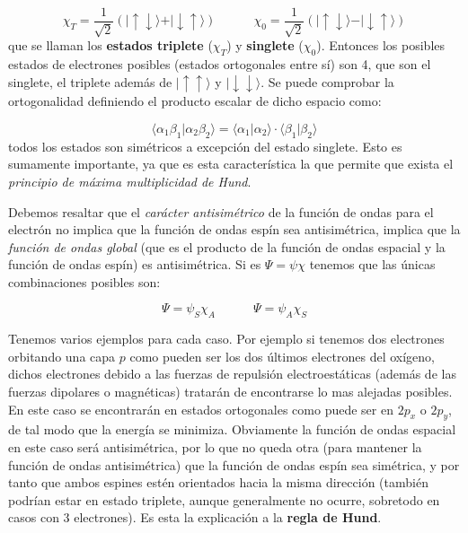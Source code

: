 \documentclass[12pt,a4paper]{article}
\numberwithin{equation}{section}
\numberwithin{figure}{section}
\newcommand{\tquad}{\quad \quad \quad}
\begin{document}
\begin{equation}
\chi_T = \frac{1}{\sqrt{2}} ( \vert \uparrow \downarrow \rangle + \vert \downarrow \uparrow \rangle) \tquad \chi_0 = \frac{1}{\sqrt{2}} ( \vert \uparrow \downarrow \rangle - \vert \downarrow \uparrow \rangle)
\end{equation}
que se llaman los \textbf{estados triplete} ($\chi_T$) y \textbf{singlete} ($\chi_0$). Entonces los posibles estados de electrones posibles (estados ortogonales entre sí) son 4, que son el singlete, el triplete además de $| \uparrow \uparrow \rangle$ y $| \downarrow \downarrow \rangle$. Se puede comprobar la ortogonalidad definiendo el producto escalar de dicho espacio como:

\begin{equation}
  \langle \alpha_1 \beta_1 \vert \alpha_2 \beta_2 \rangle = \langle \alpha_1 \vert \alpha_2 \rangle \cdot \langle \beta_1 \vert \beta_2 \rangle
\end{equation}
todos los estados son simétricos a excepción del estado singlete. Esto es sumamente importante, ya que es esta característica la que permite que exista el \textit{principio de máxima multiplicidad de Hund}. 

Debemos resaltar que el \textit{carácter antisimétrico} de la función de ondas para el electrón no implica que la función de ondas espín sea antisimétrica, implica que la \textit{función de ondas global} (que es el producto de la función de ondas espacial y la función de ondas espín) es antisimétrica. Si es $\Psi=\psi \chi$ tenemos que las únicas combinaciones posibles son:

\begin{equation}
\Psi = \psi_S \chi_A \tquad \Psi = \psi_A \chi_S
\end{equation}

Tenemos varios ejemplos para cada caso. Por ejemplo si tenemos dos electrones orbitando una capa $p$ como pueden ser los dos últimos electrones del oxígeno, dichos electrones debido a las fuerzas de repulsión electroestáticas (además de las fuerzas dipolares o magnéticas) tratarán de encontrarse lo mas alejadas posibles. En este caso se encontrarán en estados ortogonales como puede ser en $2p_x$ o $2p_y$, de tal modo que la energía se minimiza. Obviamente la función de ondas espacial en este caso será antisimétrica, por lo que no queda otra (para mantener la función de ondas antisimétrica) que la función de ondas espín sea simétrica, y por tanto que ambos espines estén orientados hacia la misma dirección (también podrían estar en estado triplete, aunque generalmente no ocurre, sobretodo en casos con 3 electrones). Es esta la explicación a la \textbf{regla de Hund}. \\
\end{document}
